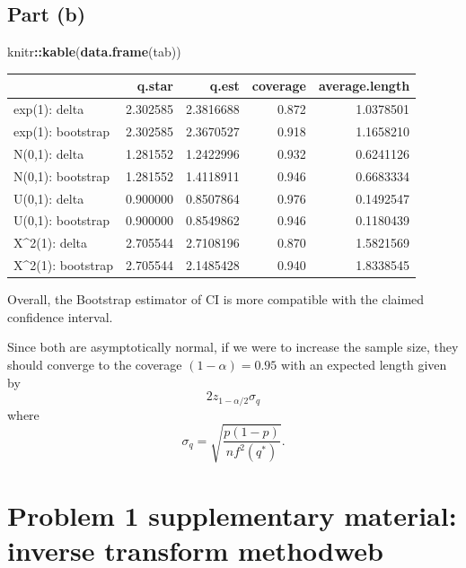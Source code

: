 \documentclass[
  11pt,
]{article}
\newenvironment{Shaded}{\begin{snugshade}}{\end{snugshade}}
\newcommand{\FunctionTok}[1]{\textcolor[rgb]{0.13,0.29,0.53}{\textbf{#1}}}
\newcommand{\NormalTok}[1]{#1}
\newcommand{\SpecialCharTok}[1]{\textcolor[rgb]{0.81,0.36,0.00}{\textbf{#1}}}
\begin{document}
\hypertarget{part-b-2}{%
\subsection{Part (b)}\label{part-b-2}}


\begin{Shaded}
\begin{Highlighting}[]
\NormalTok{knitr}\SpecialCharTok{::}\FunctionTok{kable}\NormalTok{(}\FunctionTok{data.frame}\NormalTok{(tab))}
\end{Highlighting}
\end{Shaded}

\begin{longtable}[]{@{}lrrrr@{}}
\toprule\noalign{}
& q.star & q.est & coverage & average.length \\
\midrule\noalign{}
\endhead
\bottomrule\noalign{}
\endlastfoot
exp(1): delta & 2.302585 & 2.3816688 & 0.872 & 1.0378501 \\
exp(1): bootstrap & 2.302585 & 2.3670527 & 0.918 & 1.1658210 \\
N(0,1): delta & 1.281552 & 1.2422996 & 0.932 & 0.6241126 \\
N(0,1): bootstrap & 1.281552 & 1.4118911 & 0.946 & 0.6683334 \\
U(0,1): delta & 0.900000 & 0.8507864 & 0.976 & 0.1492547 \\
U(0,1): bootstrap & 0.900000 & 0.8549862 & 0.946 & 0.1180439 \\
X\^{}2(1): delta & 2.705544 & 2.7108196 & 0.870 & 1.5821569 \\
X\^{}2(1): bootstrap & 2.705544 & 2.1485428 & 0.940 & 1.8338545 \\
\end{longtable}

Overall, the Bootstrap estimator of CI is more compatible with the
claimed confidence interval.

Since both are asymptotically normal, if we were to increase the sample
size, they should converge to the coverage \((1-\alpha) = 0.95\) with an
expected length given by \[
  2 z_{1-\alpha/2} \sigma_q
\] where \[
  \sigma_q = \sqrt{\frac{p(1-p)}{n f^2(q^*)}}.
\]

\hypertarget{problem-1-supplementary-material-inverse-transform-methodweb}{%
\section{Problem 1 supplementary material: inverse transform
methodweb}\label{problem-1-supplementary-material-inverse-transform-methodweb}}
\end{document}
